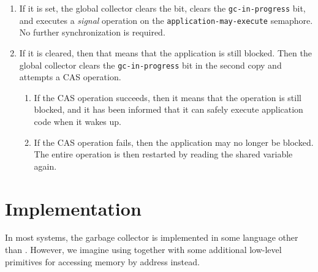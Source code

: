 \begin{enumerate}
\item If it is set, the global collector clears the bit, clears the
  \texttt{gc-in-progress} bit, and executes a \emph{signal} operation
  on the \texttt{application-may-execute} semaphore.  No further
  synchronization is required.
\item  If it is cleared, then that means that the application is still
  blocked.  Then the global collector clears the
  \texttt{gc-in-progress} bit in the second copy and attempts a CAS
  operation.
  \begin{enumerate}
  \item If the CAS operation succeeds, then it means that the
    operation is still blocked, and it has been informed that it can
    safely execute application code when it wakes up.
  \item If the CAS operation fails, then the application may no longer be
    blocked.  The entire operation is then restarted by reading the
    shared variable again.
  \end{enumerate}
\end{enumerate}

\section{Implementation}

In most systems, the garbage collector is implemented in some language
other than \commonlisp{}.  However, we imagine using \commonlisp{}
together with some additional low-level primitives for accessing
memory by address instead.

